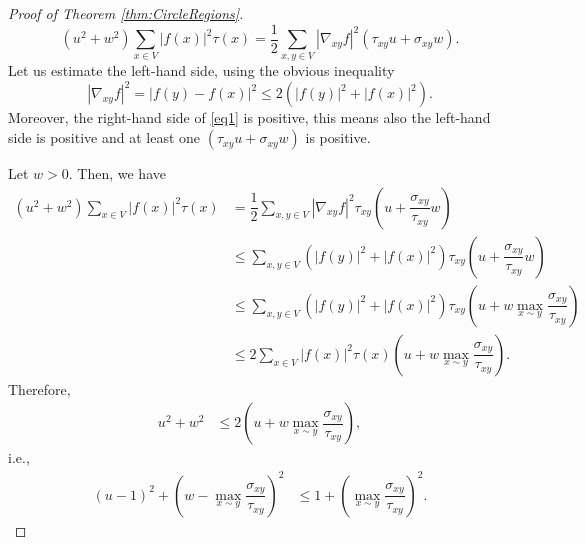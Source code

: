 \documentclass[10pt,a4paper]{amsart}
\begin{document}
\begin{proof}[Proof of Theorem \ref{thm:CircleRegions}]
\begin{equation}\label{eq1}
(u^2+w^2)\sum_{x\in V}|f(x)|^2\tau(x)=\dfrac{1}{2}\sum_{x,y\in V}|\nabla_{xy}f|^2(\tau_{xy}u+\sigma_{xy}w).
\end{equation}
Let us estimate the left-hand side, using the obvious inequality 
\begin{equation*}
|\nabla_{xy}f|^2=|f(y)-f(x)|^2\le 2(|f(y)|^2+|f(x)|^2).
\end{equation*}
Moreover, the right-hand side of \eqref{eq1} is positive, this means also the left-hand side is positive and at least one $(\tau_{xy}u+\sigma_{xy}w)$ is positive.

Let $w>0$.
Then, we have
\begin{align*}
(u^2+w^2)\sum_{x\in V}|f(x)|^2\tau(x)&=\dfrac{1}{2}\sum_{x,y\in V}|\nabla_{xy}f|^2\tau_{xy}(u+\dfrac{\sigma_{xy}}{\tau_{xy}}w)\\
&\le \sum_{x,y\in V}(|f(y)|^2+|f(x)|^2)\tau_{xy}(u+\dfrac{\sigma_{xy}}{\tau_{xy}}w) \\
&\le \sum_{x,y\in V}(|f(y)|^2+|f(x)|^2)\tau_{xy}(u+w\max_{x\sim y}\dfrac{\sigma_{xy}}{\tau_{xy}}) \\
&\le 2\sum_{x\in V}|f(x)|^2\tau(x)(u+w\max_{x\sim y}\dfrac{\sigma_{xy}}{\tau_{xy}}) .
\end{align*}
Therefore,
\begin{align*}
u^2+w^2&\le 2(u+w\max_{x\sim y}\dfrac{\sigma_{xy}}{\tau_{xy}}) ,
\end{align*}
i.e.,
\begin{align*}
(u-1)^2+\left(w-\max_{x\sim y}\dfrac{\sigma_{xy}}{\tau_{xy}}\right)^2&\le 1+\left(\max_{x\sim y}\dfrac{\sigma_{xy}}{\tau_{xy}}\right)^2.
\end{align*}


\end{proof}
\end{document}
